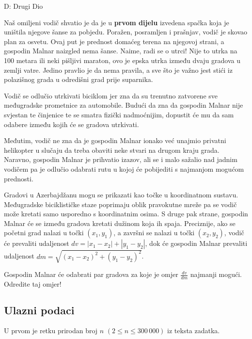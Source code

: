\begin{statement}[
  timelimit=1 s,
  memorylimit=512 MiB,
]{D: Drugi Dio}

Naš omiljeni vodič shvatio je da je u \textbf{prvom dijelu} izvedena spačka
koja je uništila njegove šanse za pobjedu. Poražen, posramljen i prašnjav,
vodič je skovao plan za osvetu. Ovaj put je prednost domaćeg terena na njegovoj
strani, a gospodin Malnar naizgled nema šanse. Naime, radi se o utrci!
Nije to utrka na 100 metara ili neki pišljivi maraton, ovo je epska utrka
između dvaju gradova u zemlji vatre. Jedino pravlio je da nema pravila, a sve
što je važno jest stići iz polazišnog grada u odredišni grad prije suparnika.

Vodič se odlučio utrkivati biciklom jer zna da su trenutno zatvorene sve
međugradske prometnice za automobile. Budući da zna da gospodin Malnar nije
svjestan te činjenice te se smatra fizički nadmoćnijim, dopustit će mu da sam
odabere između kojih će se gradova utrkivati.

Međutim, vodič ne zna da je gospodin Malnar ionako već unajmio privatni
helikopter u slučaju da treba obaviti neke stvari na drugom kraju grada.
Naravno, gospodin Malnar je prihvatio izazov, ali se i malo sažalio nad
jadnim vodičem pa je odlučio odabrati rutu u kojoj će pobijediti s najmanjom
mogućom prednosti.

Gradovi u Azerbajdžanu mogu se prikazati kao točke u koordinatnom sustavu.
Međugradske biciklističke staze poprimaju oblik pravokutne mreže pa se vodič
može kretati samo usporedno s koordinatnim osima. S druge pak strane,
gospodin Malnar će se između gradova kretati dužinom koja ih spaja.
Preciznije, ako se početni grad nalazi u točki $(x_1, y_1)$, a završni se
nalazi u točki $(x_2, y_2)$, vodič će prevaliti udaljenost $dv = |x_1 - x_2|
+ |y_1 - y_2|$, dok će gospodin Malnar prevaliti udaljenost $dm =
\sqrt{(x_1-x_2)^2 + (y_1-y_2)^2}$.

Gospodin Malnar će odabrati par gradova za koje je omjer $\frac{dv}{dm}$
najmanji mogući. Odredite taj omjer!

\subsection*{Ulazni podaci}
U prvom je retku prirodan broj $n$ $(2 \le n \le 300\,000)$ iz teksta
zadatka.


\end{statement}
